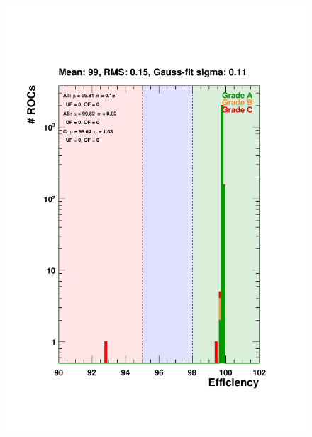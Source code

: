 \documentclass[a4paper,12pt,twoside]{article}
\begin{document}
\begin{itemize}
\begin{figure} [h!]
\centering
\begin{minipage}{.48\textwidth}
  \centering
  \includegraphics[width=\textwidth]{./Figures/Efficiency150.pdf}
  \label{Efficiency150}
\end{minipage}%
\hspace{2mm}
\begin{minipage}{.48\textwidth}
  \centering

\end{minipage}
\end{figure}
\end{itemize}
\end{document}
